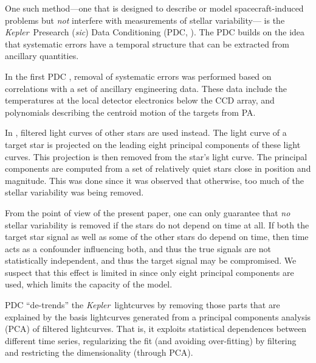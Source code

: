 \documentclass[12pt, preprint]{aastex}
\newcommand{\notenglish}[1]{\textit{#1}}
\newcommand{\sic}{\notenglish{sic}}
\newcommand{\project}[1]{\textsl{#1}}
\newcommand{\Kepler}{\project{Kepler}}
\begin{document}
One such method---one that is designed to describe or model spacecraft-induced problems
  but \emph{not} interfere with measurements of stellar variability---%
  is the \Kepler\ Presearch (\sic) Data Conditioning (PDC, \cite{pdc1}).
The PDC builds on the idea that systematic errors have a temporal structure that can be extracted from ancillary quantities. 
%

In the first PDC \citep{pdc1}, removal of systematic errors was performed based on correlations with a set of ancillary engineering data. These data include the temperatures at the local detector electronics below the CCD array, and polynomials describing the centroid motion of the targets from PA.

In \cite{pdc2,pdc3}, filtered light curves of other stars are used instead. The light curve of a target star is projected on the leading eight principal components of these light curves. This projection is then removed from the star's light curve. The principal components are computed from a set of relatively quiet stars close in position and magnitude. This was done since it was observed that otherwise, too much of the stellar variability was being removed. 

From the point of view of the present paper, one can only guarantee that {\em no} stellar variability is removed if the stars do not depend on time at all. If both the target star signal as well as some of the other stars do depend on time, then time acts as a confounder influencing both, and thus the true signals are not statistically independent, and thus the target signal may be compromised. We suspect that this effect is limited in \cite{pdc2,pdc3} since only eight principal components are used, which limits the capacity of the model.

PDC ``de-trends'' the \Kepler\ lightcurves by removing those parts that are explained by the basis lightcurves
  generated from a principal components analysis (PCA) of filtered lightcurves.
That is, it exploits statistical dependences between different time series, regularizing the fit (and avoiding over-fitting) by filtering and restricting the dimensionality (through PCA).
\end{document}
